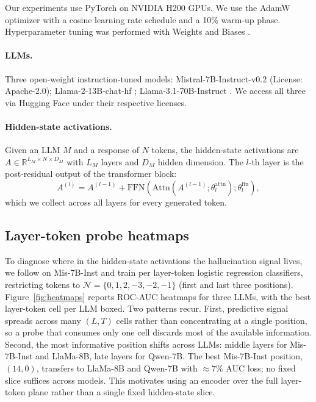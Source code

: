 Our experiments use PyTorch \citep{paszke2019} on NVIDIA H200 GPUs. We
use the AdamW optimizer \citep{loshchilov2017} with a cosine learning
rate schedule and a 10\% warm-up phase. Hyperparameter tuning was
performed with Weights and Biases \citep{biewald2020}.

\paragraph{LLMs.} Three open-weight instruction-tuned models:
Mistral-7B-Instruct-v0.2 \citep{albertqjiang2023} (License:
Apache-2.0); Llama-2-13B-chat-hf \citep{touvron2023};
Llama-3.1-70B-Instruct \citep{touvron2023}. We access all three via
Hugging Face under their respective licenses.

\paragraph{Hidden-state activations.} Given an LLM $M$ and a response
of $N$ tokens, the hidden-state activations are
$A \in \mathbb{R}^{L_M \times N \times D_M}$ with $L_M$ layers and
$D_M$ hidden dimension. The $l$-th layer is the post-residual output
of the transformer block:
\begin{equation}
A^{(l)} = A^{(l-1)} + \mathrm{FFN}(\mathrm{Attn}(A^{(l-1)}; \theta_l^{\mathrm{attn}}); \theta_l^{\mathrm{ffn}}),
\label{eq:transformer}
\end{equation}
which we collect across all layers for every generated token.

\subsection{Layer-token probe heatmaps}
\label{app:heatmaps}

To diagnose where in the hidden-state activations the hallucination signal
lives, we follow \citet{orgad2024} on Mis-7B-Inst \citep{albertqjiang2023}
and train per layer-token logistic regression classifiers, restricting
tokens to $\mathcal{N} = \{0, 1, 2, -3, -2, -1\}$ (first and last three
positions). Figure~\ref{fig:heatmaps} reports ROC-AUC
heatmaps for three LLMs, with the best layer-token cell per LLM
boxed. Two patterns recur. First, predictive signal spreads across
many $(L, T)$ cells rather than concentrating at a single position,
so a probe that consumes only one cell discards most of the available
information. Second, the most informative position shifts across LLMs:
middle layers for Mis-7B-Inst and LlaMa-8B, late layers for Qwen-7B.
The best Mis-7B-Inst position, $(14, 0)$, transfers to LlaMa-8B and
Qwen-7B with $\approx 7\%$ AUC loss; no fixed slice suffices across
models. This motivates using an encoder over the full layer-token
plane rather than a single fixed hidden-state slice.


